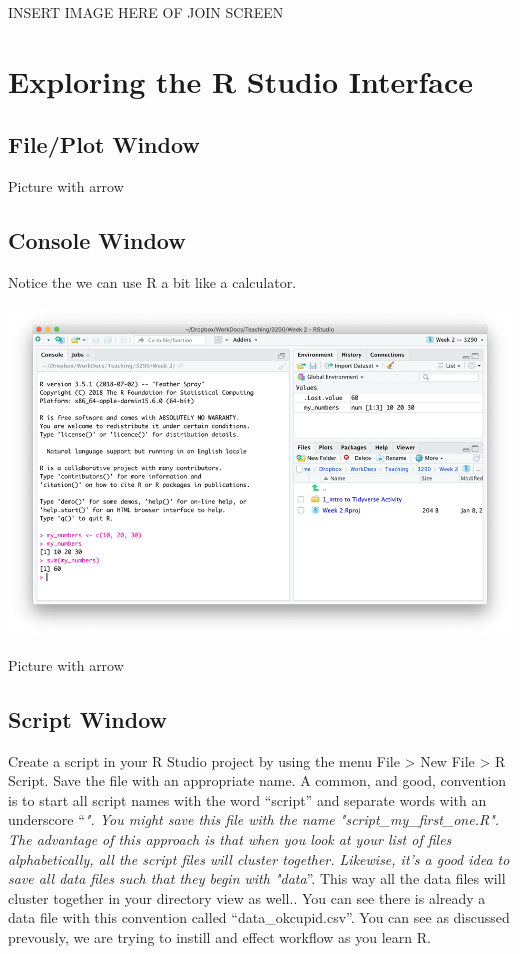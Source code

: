\documentclass[
]{krantz}
\begin{document}
INSERT IMAGE HERE OF JOIN SCREEN

\hypertarget{exploring-the-r-studio-interface}{%
\section{Exploring the R Studio Interface}\label{exploring-the-r-studio-interface}}

\hypertarget{fileplot-window}{%
\subsection{File/Plot Window}\label{fileplot-window}}

Picture with arrow

\hypertarget{console-window}{%
\subsection{Console Window}\label{console-window}}

Notice the we can use R a bit like a calculator.

\includegraphics[width=1\linewidth]{first_time/images/console}

Picture with arrow

\hypertarget{script-window}{%
\subsection{Script Window}\label{script-window}}

Create a script in your R Studio project by using the menu File \textgreater{} New File \textgreater{} R Script.
Save the file with an appropriate name. A common, and good, convention is to start all script names with the word ``script'' and separate words with an underscore ``\emph{". You might save this file with the name "script\_my\_first\_one.R". The advantage of this approach is that when you look at your list of files alphabetically, all the script files will cluster together. Likewise, it's a good idea to save all data files such that they begin with "data}''. This way all the data files will cluster together in your directory view as well.. You can see there is already a data file with this convention called ``data\_okcupid.csv''. You can see as discussed prevously, we are trying to instill and effect workflow as you learn R.
\end{document}
